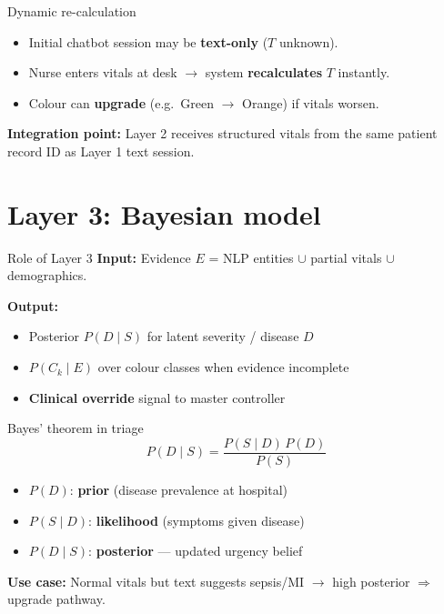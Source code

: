 \documentclass[aspectratio=169,11pt]{beamer}
\begin{document}
\begin{frame}{Dynamic re-calculation}
	\begin{itemize}
		\item Initial chatbot session may be \textbf{text-only} ($T$ unknown).
		\item Nurse enters vitals at desk $\rightarrow$ system \textbf{recalculates} $T$ instantly.
		\item Colour can \textbf{upgrade} (e.g.\ Green $\rightarrow$ Orange) if vitals worsen.
	\end{itemize}

	\vspace{0.3em}
	\textbf{Integration point:} Layer 2 receives structured vitals from the same patient record ID as Layer 1 text session.
\end{frame}

\section{Layer 3: Bayesian model}

\begin{frame}{Role of Layer 3}
	\textbf{Input:} Evidence $E$ = NLP entities $\cup$ partial vitals $\cup$ demographics.

	\textbf{Output:}
	\begin{itemize}
		\item Posterior $P(D \mid S)$ for latent severity / disease $D$
		\item $P(C_k \mid E)$ over colour classes when evidence incomplete
		\item \textbf{Clinical override} signal to master controller
	\end{itemize}
\end{frame}

\begin{frame}{Bayes' theorem in triage}
	\begin{equation*}
		P(D \mid S) = \frac{P(S \mid D)\, P(D)}{P(S)}
	\end{equation*}
	\begin{itemize}
		\item $P(D)$: \textbf{prior} (disease prevalence at hospital)
		\item $P(S \mid D)$: \textbf{likelihood} (symptoms given disease)
		\item $P(D \mid S)$: \textbf{posterior} --- updated urgency belief
	\end{itemize}

	\vspace{0.3em}
	\textbf{Use case:} Normal vitals but text suggests sepsis/MI $\rightarrow$ high posterior $\Rightarrow$ upgrade pathway.
\end{frame}
\end{document}
